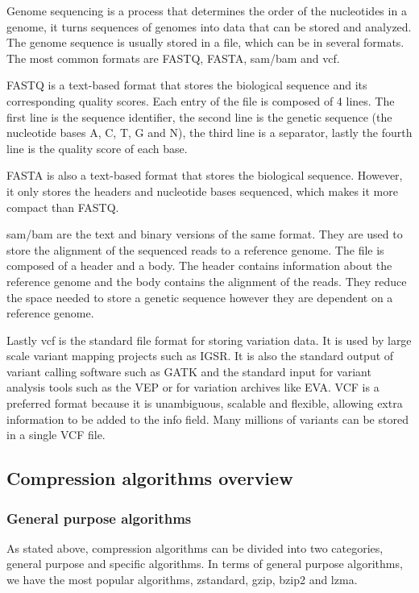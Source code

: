 Genome sequencing is a process that determines the order of the nucleotides in a genome, it turns sequences of genomes into data that can be stored and analyzed. The genome sequence is usually stored in a file, which can be in several formats. The most common formats are FASTQ, FASTA, \ac{sam}/\ac{bam} and \ac{vcf}.

FASTQ is a text-based format that stores the biological sequence and its corresponding quality scores. Each entry of the file is composed of 4 lines. The first line is the sequence identifier, the second line is the genetic sequence (the nucleotide bases A, C, T, G and N), the third line is a separator, lastly the fourth line is the quality score of each base.

FASTA is also a text-based format that stores the biological sequence. However, it only stores the headers and nucleotide bases sequenced, which makes it more compact than FASTQ.

\ac{sam}/\ac{bam} are the text and binary versions of the same format. They are used to store the alignment of the sequenced reads to a reference genome. The file is composed of a header and a body. The header contains information about the reference genome and the body contains the alignment of the reads. They reduce the space needed to store a genetic sequence however they are dependent on a reference genome.

Lastly \ac{vcf} is the standard file format for storing variation data. It is used by large scale variant mapping projects such as IGSR. It is also the standard output of variant calling software such as GATK and the standard input for variant analysis tools such as the VEP or for variation archives like EVA.
VCF is a preferred format because it is unambiguous, scalable and flexible, allowing extra information to be added to the info field. Many millions of variants can be stored in a single VCF file. 

\subsection{Compression algorithms overview}

\subsubsection{General purpose algorithms}

As stated above, compression algorithms can be divided into two categories, general purpose and specific algorithms. In terms of general purpose algorithms, we have the most popular algorithms, zstandard, gzip, bzip2 and lzma.

